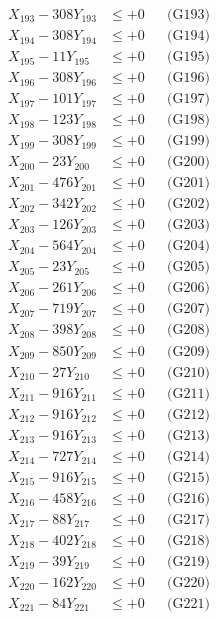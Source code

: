 \documentclass[a4paper,10pt]{article}
\begin{document}
{\begin{align}
X_{193} - 308Y_{193} &\leq +0 && \text{(G193)} \\
X_{194} - 308Y_{194} &\leq +0 && \text{(G194)} \\
X_{195} - 11Y_{195} &\leq +0 && \text{(G195)} \\
X_{196} - 308Y_{196} &\leq +0 && \text{(G196)} \\
X_{197} - 101Y_{197} &\leq +0 && \text{(G197)} \\
X_{198} - 123Y_{198} &\leq +0 && \text{(G198)} \\
X_{199} - 308Y_{199} &\leq +0 && \text{(G199)} \\
X_{200} - 23Y_{200} &\leq +0 && \text{(G200)} \\
\allowbreak
X_{201} - 476Y_{201} &\leq +0 && \text{(G201)} \\
X_{202} - 342Y_{202} &\leq +0 && \text{(G202)} \\
X_{203} - 126Y_{203} &\leq +0 && \text{(G203)} \\
X_{204} - 564Y_{204} &\leq +0 && \text{(G204)} \\
X_{205} - 23Y_{205} &\leq +0 && \text{(G205)} \\
X_{206} - 261Y_{206} &\leq +0 && \text{(G206)} \\
X_{207} - 719Y_{207} &\leq +0 && \text{(G207)} \\
X_{208} - 398Y_{208} &\leq +0 && \text{(G208)} \\
X_{209} - 850Y_{209} &\leq +0 && \text{(G209)} \\
X_{210} - 27Y_{210} &\leq +0 && \text{(G210)} \\
\allowbreak
X_{211} - 916Y_{211} &\leq +0 && \text{(G211)} \\
X_{212} - 916Y_{212} &\leq +0 && \text{(G212)} \\
X_{213} - 916Y_{213} &\leq +0 && \text{(G213)} \\
X_{214} - 727Y_{214} &\leq +0 && \text{(G214)} \\
X_{215} - 916Y_{215} &\leq +0 && \text{(G215)} \\
X_{216} - 458Y_{216} &\leq +0 && \text{(G216)} \\
X_{217} - 88Y_{217} &\leq +0 && \text{(G217)} \\
X_{218} - 402Y_{218} &\leq +0 && \text{(G218)} \\
X_{219} - 39Y_{219} &\leq +0 && \text{(G219)} \\
X_{220} - 162Y_{220} &\leq +0 && \text{(G220)} \\
\allowbreak
X_{221} - 84Y_{221} &\leq +0 && \text{(G221)} \\

\end{align}}
\end{document}
